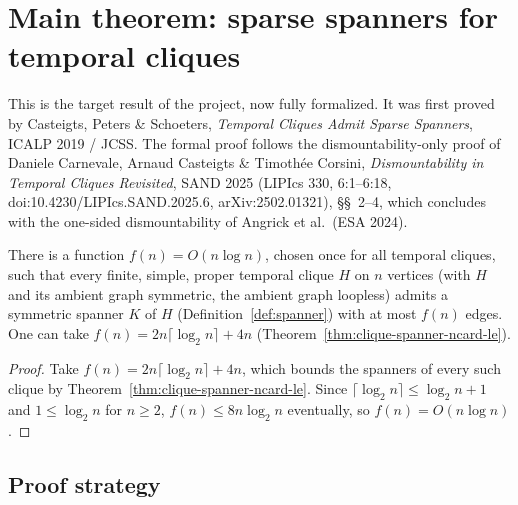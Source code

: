 \chapter{Main theorem: sparse spanners for temporal cliques}
\label{chap:main-theorem}

This is the target result of the project, now fully formalized. It was first
proved by Casteigts, Peters \& Schoeters, \emph{Temporal Cliques Admit Sparse
Spanners}, ICALP 2019 / JCSS. The formal proof follows the dismountability-only
proof of Daniele Carnevale, Arnaud Casteigts \& Timothée Corsini,
\emph{Dismountability in Temporal Cliques Revisited}, SAND 2025 (LIPIcs 330,
6:1--6:18, doi:10.4230/LIPIcs.SAND.2025.6, arXiv:2502.01321), \S\S~2--4, which
concludes with the one-sided dismountability of Angrick et al.\ (ESA 2024).

\begin{theorem}
  \label{thm:main-spanner-bound}
  \leanok
  There is a function $f(n) = O(n \log n)$, chosen once for all temporal
  cliques, such that every finite, simple, proper temporal clique $H$ on $n$
  vertices (with $H$ and its ambient graph symmetric, the ambient graph
  loopless) admits a symmetric spanner $K$ of $H$ (Definition~\ref{def:spanner})
  with at most $f(n)$ edges. One can take
  $f(n) = 2n\lceil\log_2 n\rceil + 4n$
  (Theorem~\ref{thm:clique-spanner-ncard-le}).
\end{theorem}

\begin{proof}
  \leanok
  Take $f(n) = 2n\lceil\log_2 n\rceil + 4n$, which bounds the spanners of
  every such clique by Theorem~\ref{thm:clique-spanner-ncard-le}. Since
  $\lceil\log_2 n\rceil \le \log_2 n + 1$ and $1 \le \log_2 n$ for $n \ge 2$,
  $f(n) \le 8 n \log_2 n$ eventually, so $f(n) = O(n \log n)$.
\end{proof}

\section*{Proof strategy}

